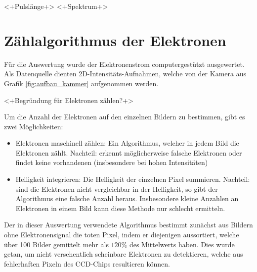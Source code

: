 \documentclass[bachelor,       %
               twoside,        %
               BCOR10mm,       %
               english,ngerman, %
               ]{GAUBM}
\begin{document}
<+Pulslänge+>
<+Spektrum+>

\section{Zählalgorithmus der Elektronen}
\label{sec:zaehlalgorithmus}
Für die Auswertung wurde der Elektronenstrom computergestützt ausgewertet.
Als Datenquelle dienten 2D-Intensitäts-Aufnahmen, welche von der Kamera aus Grafik \ref{fig:aufbau_kammer} aufgenommen werden.

<+Begründung für Elektronen zählen?+>

Um die Anzahl der Elektronen auf den einzelnen Bildern zu bestimmen, gibt es zwei Möglichkeiten:
\begin{itemize}
\item Elektronen maschinell zählen: Ein Algorithmus, welcher in jedem Bild die Elektronen zählt. Nachteil: erkennt möglicherweise falsche Elektronen oder findet keine vorhandenen (insbesondere bei hohen Intensitäten)
\item Helligkeit integrieren: Die Helligkeit der einzelnen Pixel summieren. Nachteil: sind die Elektronen nicht vergleichbar in der Helligkeit, so gibt der Algorithmus eine falsche Anzahl heraus. Insbesondere kleine Anzahlen an Elektronen in einem Bild kann diese Methode nur schlecht ermitteln.
\end{itemize}

Der in dieser Auswertung verwendete Algorithmus bestimmt zunächst aus Bildern ohne Elektronensignal die toten Pixel, indem er diejenigen aussortiert, welche über 100 Bilder gemittelt mehr als $120\%$ des Mittelwerts haben.
Dies wurde getan, um nicht versehentlich scheinbare Elektronen zu detektieren, welche aus fehlerhaften Pixeln des CCD-Chips resultieren können.
\end{document}
